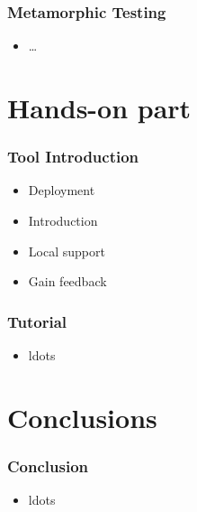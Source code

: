 \begin{frame}[fragile]
\frametitle{Metamorphic Testing}
\begin{itemize}
\item \ldots
\end{itemize}
\end{frame}

\section{Hands-on part}

\begin{frame}[fragile]
\frametitle{Tool Introduction}
\begin{itemize}
\item Deployment
\item Introduction
\item Local support
\item Gain feedback
\end{itemize}
\end{frame}

\begin{frame}[fragile]
\frametitle{Tutorial}
\begin{itemize}
\item ldots
\end{itemize}
\end{frame}

\section{Conclusions}

\begin{frame}[fragile]
\frametitle{Conclusion}
\begin{itemize}
\item ldots
\end{itemize}
\end{frame}

